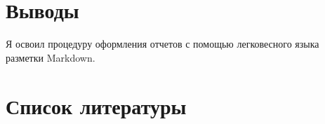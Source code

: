 \documentclass[
  english,
  russian,
  12pt,
  a4paper,
  DIV=11,
  numbers=noendperiod]{scrreprt}
\begin{document}
\chapter{Выводы}\label{ux432ux44bux432ux43eux434ux44b}

Я освоил процедуру оформления отчетов с помощью легковесного языка
разметки Markdown.

\chapter*{Список
литературы}\label{ux441ux43fux438ux441ux43eux43a-ux43bux438ux442ux435ux440ux430ux442ux443ux440ux44b}

\printbibliography[heading=none]
\end{document}
